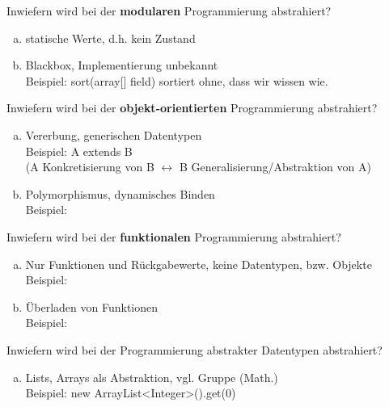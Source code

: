 \begin{card}
	Inwiefern wird bei der \textbf{modularen} Programmierung abstrahiert?
	\hr
	\begin{enumerate}[a)]
	\item statische Werte, d.h. kein Zustand
	\item Blackbox, Implementierung unbekannt\\
		Beispiel: sort(array[] field) sortiert ohne, dass wir wissen wie.
	\end{enumerate}

\end{card}

\begin{card}
	Inwiefern wird bei der \textbf{objekt-orientierten} Programmierung abstrahiert?
	\hr
	\begin{enumerate}[a)]
	\item Vererbung, generischen Datentypen\\
			Beispiel: A extends B\\
			(A Konkretisierung  von B $\leftrightarrow$ B Generalisierung/Abstraktion von A)
	\item Polymorphismus, dynamisches Binden\\
			Beispiel:
	\end{enumerate}
\end{card}

\begin{card}
	Inwiefern wird bei der \textbf{funktionalen} Programmierung abstrahiert?
	\hr
	\begin{enumerate}[a)]
	\item Nur Funktionen und Rückgabewerte, keine Datentypen, bzw. Objekte\\
		Beispiel:
	\item Überladen von Funktionen\\
		Beispiel:
	\end{enumerate}
\end{card}

\begin{card}
	Inwiefern wird bei der Programmierung abstrakter Datentypen abstrahiert?
	\hr
	\begin{enumerate}[a)]
	\item Lists, Arrays als Abstraktion, vgl. Gruppe (Math.)\\
		Beispiel: new ArrayList<Integer>().get(0)
	\end{enumerate}
\end{card}

